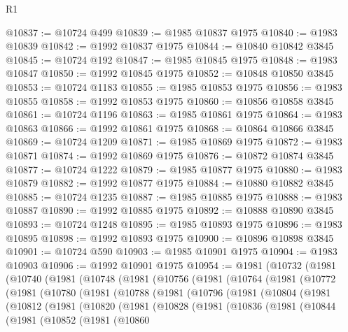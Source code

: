 \begin{lexlean}{R1}
\begin{coremodule}
@10837 := @10724 @499
@10839 := @1985 @10837 @1975
@10840 := @1983 @10839
@10842 := @1992 @10837 @1975
@10844 := @10840 @10842 @3845
@10845 := @10724 @192
@10847 := @1985 @10845 @1975
@10848 := @1983 @10847
@10850 := @1992 @10845 @1975
@10852 := @10848 @10850 @3845
@10853 := @10724 @1183
@10855 := @1985 @10853 @1975
@10856 := @1983 @10855
@10858 := @1992 @10853 @1975
@10860 := @10856 @10858 @3845
@10861 := @10724 @1196
@10863 := @1985 @10861 @1975
@10864 := @1983 @10863
@10866 := @1992 @10861 @1975
@10868 := @10864 @10866 @3845
@10869 := @10724 @1209
@10871 := @1985 @10869 @1975
@10872 := @1983 @10871
@10874 := @1992 @10869 @1975
@10876 := @10872 @10874 @3845
@10877 := @10724 @1222
@10879 := @1985 @10877 @1975
@10880 := @1983 @10879
@10882 := @1992 @10877 @1975
@10884 := @10880 @10882 @3845
@10885 := @10724 @1235
@10887 := @1985 @10885 @1975
@10888 := @1983 @10887
@10890 := @1992 @10885 @1975
@10892 := @10888 @10890 @3845
@10893 := @10724 @1248
@10895 := @1985 @10893 @1975
@10896 := @1983 @10895
@10898 := @1992 @10893 @1975
@10900 := @10896 @10898 @3845
@10901 := @10724 @590
@10903 := @1985 @10901 @1975
@10904 := @1983 @10903
@10906 := @1992 @10901 @1975
@10954 := @1981
    (@10732
      (@1981
        (@10740
          (@1981
            (@10748
              (@1981
                (@10756
                  (@1981
                    (@10764
                      (@1981
                        (@10772
                          (@1981
                            (@10780
                              (@1981
                                (@10788
                                  (@1981
                                    (@10796
                                      (@1981
                                        (@10804
                                          (@1981
                                            (@10812
                                              (@1981
                                                (@10820
                                                  (@1981
                                                    (@10828
                                                      (@1981
                                                        (@10836
                                                          (@1981
                                                            (@10844
                                                              (@1981
                                                                (@10852
                                                                  (@1981
                                                                    (@10860

\end{coremodule}
\end{lexlean}
